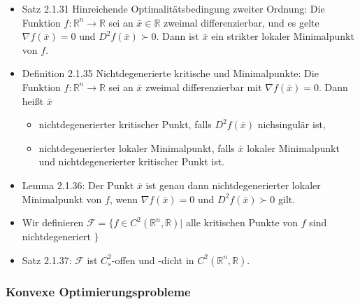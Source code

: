 \documentclass[paper=a4, fontsize=11pt]{scrartcl} %
\numberwithin{equation}{section} %
\numberwithin{figure}{section} %
\numberwithin{table}{section} %
\begin{document}
\begin{itemize}
\begin{itemize}
\end{itemize}
\item Satz 2.1.31 Hinreichende Optimalitätsbedingung zweiter Ordnung: Die Funktion $f: \mathbb{R}^n \rightarrow \mathbb{R}$ sei an $\bar{x} \in \mathbb{R}$ zweimal differenzierbar, und es gelte $\nabla f(\bar{x}) = 0$ und $D^2f(\bar{x}) \succ 0$. Dann ist $\bar{x}$ ein strikter lokaler Minimalpunkt von $f$.
\item Definition 2.1.35 Nichtdegenerierte kritische und Minimalpunkte: Die Funktion $f: \mathbb{R}^n \rightarrow \mathbb{R}$ sei an $\bar{x}$ zweimal differenzierbar mit $\nabla f(\bar{x}) = 0$. Dann heißt $\bar{x}$
\begin{itemize}
\item nichtdegenerierter kritischer Punkt, falls $D^2f(\bar{x})$ nichsingulär ist,
\item nichtdegenerierter lokaler Minimalpunkt, falls $\bar{x}$ lokaler Minimalpunkt und nichtdegenerierter kritischer Punkt ist.
\end{itemize}
\item Lemma 2.1.36: Der Punkt $\bar{x}$ ist genau dann nichtdegenerierter lokaler Minimalpunkt von $f$, wenn $\nabla f(\bar{x}) = 0$ und $D^2f(\bar{x}) \succ 0$ gilt.
\item Wir definieren $\mathcal{F} = \{  f \in C^2(\mathbb{R}^n,\mathbb{R}) |$ alle kritischen Punkte von $f$ sind nichtdegeneriert $\}$
\item Satz 2.1.37: $\mathcal{F}$ ist $C^2_s$-offen und -dicht in $C^2(\mathbb{R}^n,\mathbb{R})$.
\end{itemize}

\subsubsection{Konvexe Optimierungsprobleme}
\end{document}

